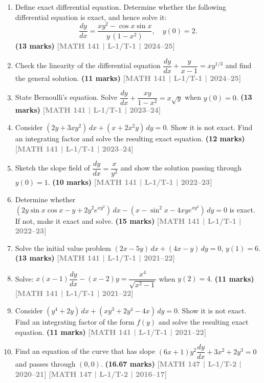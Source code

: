 \documentclass[12pt,a3paper]{article}
\newcommand{\yr}[1]{\hfill\textcolor{gray}{\small\textbf{[#1]}}}
\newcommand{\mk}[1]{\textcolor{orange!70!black}{\small\textbf{(#1 marks)}}}
\begin{document}
\begin{enumerate}
  
\item Define exact differential equation. Determine whether the following differential equation is exact, and hence solve it:
    \[
      \frac{dy}{dx}=\frac{xy^{2}-\cos x\sin x}{y\,(1-x^{2})}, \quad y(0)=2.
    \]  
\mk{13} \yr{MATH 141 | L-1/T-1 | 2024--25}

\item Check the linearity of the differential equation $\dfrac{dy}{dx}+\dfrac{y}{x-1}=xy^{1/3}$ and find the general solution. 
\mk{11} \yr{MATH 141 | L-1/T-1 | 2024--25}
  
\item State Bernoulli's equation. Solve $\dfrac{dy}{dx}+\dfrac{xy}{1-x^{2}}=x\sqrt{y}$ when $y(0)=0$.
\mk{13} \yr{MATH 141 | L-1/T-1 | 2023--24}

\item Consider $(2y+3xy^{2})\,dx+(x+2x^{2}y)\,dy=0$. Show it is not exact. Find an integrating factor and solve the resulting exact equation.
\mk{12} \yr{MATH 141 | L-1/T-1 | 2023--24}

\item Sketch the slope field of $\dfrac{dy}{dx}=\dfrac{x}{y^{2}}$ and show the solution passing through $y(0)=1$.
\mk{10} \yr{MATH 141 | L-1/T-1 | 2022--23}

\item Determine whether $(2y\sin x\cos x-y+2y^{2}e^{xy^{2}})\,dx-(x-\sin^{2}x-4xye^{xy^{2}})\,dy=0$ is exact. If not, make it exact and solve.
\mk{15} \yr{MATH 141 | L-1/T-1 | 2022--23}

\item Solve the initial value problem $(2x-5y)\,dx+(4x-y)\,dy=0$, $y(1)=6$.
\mk{13} \yr{MATH 141 | L-1/T-1 | 2021--22}

\item Solve: $x(x-1)\dfrac{dy}{dx}-(x-2)y=\dfrac{x^{4}}{\sqrt{x^{2}-1}}$ when $y(2)=4$.
\mk{11} \yr{MATH 141 | L-1/T-1 | 2021--22}

\item Consider $(y^{4}+2y)\,dx+(xy^{3}+2y^{4}-4x)\,dy=0$. Show it is not exact. Find an integrating factor of the form $f(y)$ and solve the resulting exact equation.
\mk{11} \yr{MATH 141 | L-1/T-1 | 2021--22}

\item Find an equation of the curve that has slope $(6x+1)y^{2}\dfrac{dy}{dx}+3x^{2}+2y^{3}=0$ and passes through $(0,0)$.
\mk{16.67} \yr{MATH 147 | L-1/T-2 | 2020--21} \yr{MATH 147 | L-1/T-2 | 2016--17}


\end{enumerate}
\end{document}

